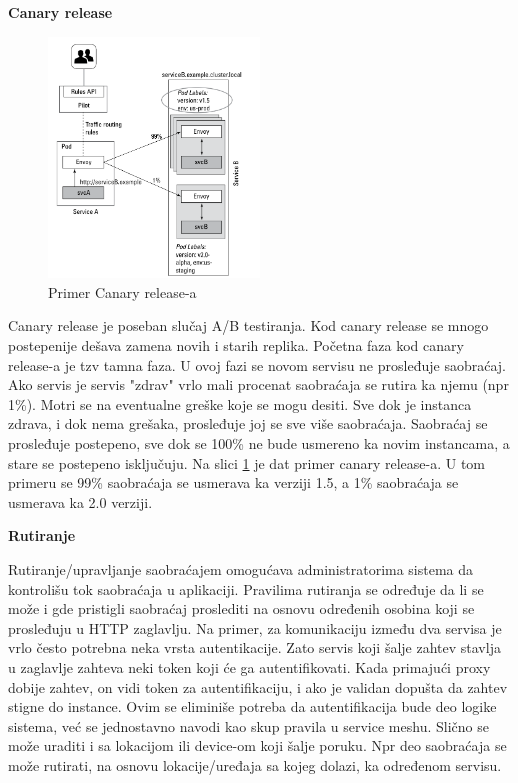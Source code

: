 \documentclass[a4paper,12pt]{report}
\begin{document}
\textbf{Canary release}\newline

\begin{figure}[h]
    \centering
    \includegraphics[width=0.5\textwidth]{canary_release_example}
    \caption{Primer Canary release-a}
    \label{fig:canary-release-example}
\end{figure}

Canary release je poseban slučaj A/B testiranja. Kod canary release se mnogo postepenije dešava zamena novih i starih replika. Početna faza kod canary release-a je tzv tamna faza. U ovoj fazi se novom servisu ne prosleđuje saobraćaj. Ako servis je servis "zdrav" vrlo mali procenat saobraćaja se rutira ka njemu (npr 1\%). Motri se na eventualne greške koje se mogu desiti. Sve dok je instanca zdrava, i dok nema grešaka, prosleđuje joj se sve više saobraćaja. Saobraćaj se prosleđuje postepeno, sve dok se 100\% ne bude usmereno ka novim instancama, a stare se postepeno isključuju. Na slici \ref{fig:canary-release-example} je dat primer canary release-a. U tom primeru se 99\% saobraćaja se usmerava ka verziji 1.5, a 1\% saobraćaja se usmerava ka 2.0 verziji. \newline

\textbf{Rutiranje}\newline

Rutiranje/upravljanje saobraćajem omogućava administratorima sistema da kontrolišu tok saobraćaja u aplikaciji. Pravilima rutiranja se određuje da li se može i gde pristigli saobraćaj proslediti na osnovu određenih osobina koji se prosleđuju u HTTP zaglavlju. Na primer, za komunikaciju između dva servisa je vrlo često potrebna neka vrsta autentikacije. Zato servis koji šalje zahtev stavlja u zaglavlje zahteva neki token koji će ga autentifikovati. Kada primajući proxy dobije zahtev, on vidi token za autentifikaciju, i ako je validan dopušta da zahtev stigne do instance. Ovim se eliminiše potreba da autentifikacija bude deo logike sistema, već se jednostavno navodi kao skup pravila u service meshu. Slično se može uraditi i sa lokacijom ili device-om koji šalje poruku. Npr deo saobraćaja se može rutirati, na osnovu lokacije/uređaja sa kojeg dolazi, ka određenom servisu.\newline
\end{document}
